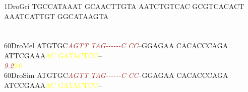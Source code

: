 \documentclass[11pt,twoside,reqno,a4paper]{article}
\begin{document}
{1\hspace*{3\charwidth}DroGri	TGCCATAAAT	GCAACTTGTA	AATCTGTCAC	GCGTCACACT	AAATCATTGT	GGCATAAGTA	\\
\hspace*{4\charwidth}\hspace*{7\charwidth}\hspace*{1\charwidth}\hspace*{1\charwidth}\hspace*{1\charwidth}\hspace*{1\charwidth}\hspace*{1\charwidth}\hspace*{1\charwidth}\\
\\
60\hspace*{2\charwidth}DroMel	ATGTGC\textit{\textcolor{brown}{A}}\textit{\textcolor{brown}{G}}\textit{\textcolor{brown}{T}}\textit{\textcolor{brown}{T}}	\textit{\textcolor{brown}{T}}\textit{\textcolor{brown}{A}}\textit{\textcolor{brown}{G}}\textit{\textcolor{brown}{-}}\textit{\textcolor{brown}{-}}\textit{\textcolor{brown}{-}}\textit{\textcolor{brown}{-}}\textit{\textcolor{brown}{-}}\textit{\textcolor{brown}{-}}\textit{\textcolor{brown}{C}}	\textit{\textcolor{brown}{C}}\textit{\textcolor{brown}{C}}--GGAGAA	CACACCCAGA	ATTCGAAA\textcolor{yellow}{A}\textcolor{yellow}{C}	\textcolor{yellow}{G}\textcolor{yellow}{A}\textcolor{yellow}{T}\textcolor{yellow}{A}\textcolor{yellow}{C}\textcolor{yellow}{T}\textcolor{yellow}{C}\textcolor{yellow}{C}--	\\
\hspace*{4\charwidth}\hspace*{7\charwidth}\hspace*{6\charwidth}\textit{\textcolor{brown}{9.2}}\hspace*{1\charwidth}\hspace*{1\charwidth}\hspace*{1\charwidth}\hspace*{1\charwidth}\hspace*{39\charwidth}\textcolor{yellow}{9.0}\hspace*{1\charwidth}\hspace*{1\charwidth}\\
60\hspace*{2\charwidth}DroSim	ATGTGC\textit{\textcolor{brown}{A}}\textit{\textcolor{brown}{G}}\textit{\textcolor{brown}{T}}\textit{\textcolor{brown}{T}}	\textit{\textcolor{brown}{T}}\textit{\textcolor{brown}{A}}\textit{\textcolor{brown}{G}}\textit{\textcolor{brown}{-}}\textit{\textcolor{brown}{-}}\textit{\textcolor{brown}{-}}\textit{\textcolor{brown}{-}}\textit{\textcolor{brown}{-}}\textit{\textcolor{brown}{-}}\textit{\textcolor{brown}{C}}	\textit{\textcolor{brown}{C}}\textit{\textcolor{brown}{C}}--GGAGAA	CACACCCAGA	ATCCGAAA\textcolor{yellow}{A}\textcolor{yellow}{C}	\textcolor{yellow}{G}\textcolor{yellow}{A}\textcolor{yellow}{T}\textcolor{yellow}{A}\textcolor{yellow}{C}\textcolor{yellow}{T}\textcolor{yellow}{C}\textcolor{yellow}{C}--	\\
}
\end{document}
